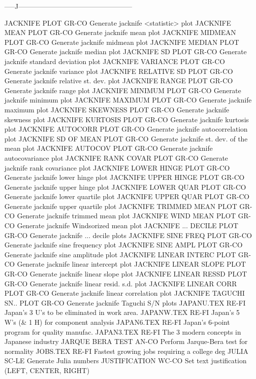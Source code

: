 -----J--------------------------------------------------

JACKNIFE PLOT               GR-CO Generate jacknife <statistic> plot
JACKNIFE MEAN PLOT          GR-CO Generate jacknife mean plot
JACKNIFE MIDMEAN PLOT       GR-CO Generate jacknife midmean plot
JACKNIFE MEDIAN PLOT        GR-CO Generate jacknife median plot
JACKNIFE SD PLOT            GR-CO Generate jacknife standard deviation plot
JACKNIFE VARIANCE PLOT      GR-CO Generate jacknife variance plot
JACKNIFE RELATIVE SD PLOT   GR-CO Generate jacknife relative st. dev. plot
JACKNIFE RANGE PLOT         GR-CO Generate jacknife range plot
JACKNIFE MINIMUM PLOT       GR-CO Generate jacknife minimum plot
JACKNIFE MAXIMUM PLOT       GR-CO Generate jacknife maximum plot
JACKNIFE SKEWNESS PLOT      GR-CO Generate jacknife skewness plot
JACKNIFE KURTOSIS PLOT      GR-CO Generate jacknife kurtosis plot
JACKNIFE AUTOCORR PLOT      GR-CO Generate jacknife autocorrelation plot
JACKNIFE SD OF MEAN PLOT    GR-CO Generate jacknife st. dev. of the mean plot
JACKNIFE AUTOCOV PLOT       GR-CO Generate jacknife autocovariance plot
JACKNIFE RANK COVAR PLOT    GR-CO Generate jacknife rank covariance plot
JACKNIFE LOWER HINGE PLOT   GR-CO Generate jacknife lower hinge plot
JACKNIFE UPPER HINGE PLOT   GR-CO Generate jacknife upper hinge plot
JACKNIFE LOWER QUAR PLOT    GR-CO Generate jacknife lower quartile plot
JACKNIFE UPPER QUAR PLOT    GR-CO Generate jacknife upper quartile plot
JACKNIFE TRIMMED MEAN PLOT  GR-CO Generate jacknife trimmed mean plot
JACKNIFE WIND MEAN PLOT     GR-CO Generate jacknife Windsorized mean plot
JACKNIFE ... DECILE PLOT    GR-CO Generate jacknife ... decile plots
JACKNIFE SINE FREQ PLOT     GR-CO Generate jacknife sine frequency plot
JACKNIFE SINE AMPL PLOT     GR-CO Generate jacknife sine amplitude plot
JACKNIFE LINEAR INTERC PLOT GR-CO Generate jacknife linear intercept plot
JACKNIFE LINEAR SLOPE PLOT  GR-CO Generate jacknife linear slope plot
JACKNIFE LINEAR RESSD PLOT  GR-CO Generate jacknife linear resid. s.d. plot
JACKNIFE LINEAR CORR PLOT   GR-CO Generate jacknife linear correlation plot
JACKNIFE TAGUCHI SN.. PLOT  GR-CO Generate jacknife Taguchi S/N plots
JAPANU.TEX                  RE-FI Japan's 3  U's to be eliminated in work area.
JAPANW.TEX                  RE-FI Japan's 5 W's (& 1 H) for component analysis
JAPAN6.TEX                  RE-FI Japan's 6-point program for quality manufac.
JAPAN3.TEX                  RE-FI The 3 modern concepts in Japanese industry
JARQUE BERA TEST            AN-CO Perform Jarque-Bera test for normality
JOBS.TEX                    RE-FI Fastest growing jobs requiring a college deg
JULIA                       SC-LE Generate Julia numbers
JUSTIFICATION               WC-CO Set text justification (LEFT, CENTER, RIGHT)

